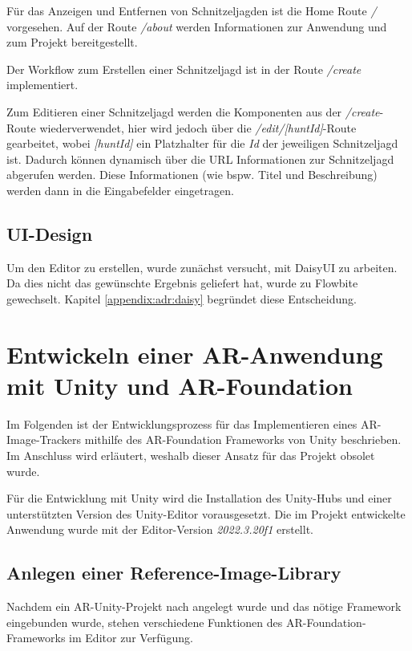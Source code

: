 Für das Anzeigen und Entfernen von Schnitzeljagden ist die Home Route \textit{/} vorgesehen. Auf der Route \textit{/about} werden Informationen zur Anwendung und zum Projekt bereitgestellt.

Der Workflow zum Erstellen einer Schnitzeljagd ist in der Route \textit{/create} implementiert.

Zum Editieren einer Schnitzeljagd werden die Komponenten aus der \textit{/create}-Route wiederverwendet, hier wird jedoch über die \textit{/edit/[huntId]}-Route gearbeitet, wobei \textit{[huntId]} ein Platzhalter für die \textit{Id} der jeweiligen Schnitzeljagd ist. Dadurch können dynamisch über die URL Informationen zur Schnitzeljagd abgerufen werden. Diese Informationen (wie bspw. Titel und Beschreibung) werden dann in die Eingabefelder eingetragen.

\subsection{UI-Design}

Um den Editor zu erstellen, wurde zunächst versucht, mit DaisyUI zu arbeiten. Da dies nicht das gewünschte Ergebnis geliefert hat, wurde zu Flowbite gewechselt. Kapitel \ref{appendix:adr:daisy} begründet diese Entscheidung.

\section{Entwickeln einer AR-Anwendung mit Unity und AR-Foundation} \label{cha:implementierung:unityardev}

Im Folgenden ist der Entwicklungsprozess für das Implementieren eines AR-Image-Trackers mithilfe des AR-Foundation Frameworks von Unity beschrieben. Im Anschluss wird erläutert, weshalb dieser Ansatz für das Projekt obsolet wurde.

Für die Entwicklung mit Unity wird die Installation des Unity-Hubs und einer unterstützten Version des Unity-Editor vorausgesetzt. Die im Projekt entwickelte Anwendung wurde mit der Editor-Version \textit{2022.3.20f1} erstellt.

\subsection{Anlegen einer Reference-Image-Library}

Nachdem ein AR-Unity-Projekt nach \autocite{Unity2024:ProjectSetup} angelegt wurde und das nötige Framework eingebunden wurde, stehen verschiedene Funktionen des AR-Foundation-Frameworks im Editor zur Verfügung.

